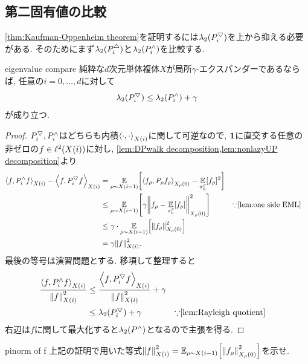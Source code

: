 \subsection{第二固有値の比較}
\cref{thm:Kaufman-Oppenheim theorem}を証明するには$\lambda_2(P^{\bigtriangledown}_i)$を上から抑える必要がある.
そのためにまず$\lambda_2(P^{\triangle}_i)$と$\lambda_2(P^{\land}_i)$を比較する.
\begin{lemma}{}{eigenvalue compare}
    純粋な$d$次元単体複体$X$が局所$\gamma$-エクスパンダーであるならば, 任意の$i=0,\dots,d$に対して
    \[ \lambda_2(P^{\bigtriangledown}_i) \le \lambda_2(P^{\land}_i) + \gamma \]
    が成り立つ.
\end{lemma}
\begin{proof}
    $P^{\bigtriangledown}_i,P^{\land}_i$はどちらも内積$\left\langle\cdot,\cdot\right\rangle_{X(i)}$に関して可逆なので,
    $\mathbf{1}$に直交する任意の非ゼロの$f \in \ispace$に対し,
    \cref{lem:DPwalk decomposition,lem:nonlazyUP decomposition}より
    \begin{align*}
        \iprod{f,\nonlazyPUD_i f} - \iprod{f,\PDU_i f} &= \E_{\rho\sim X(i-1)}\sbra*{ \iprod[X_\rho(0)]{f_\rho, P_\rho f_\rho} - \E_{\pi^\rho_0}[f_\rho]^2}  \\
        & \le \E_{\rho \sim X(i-1)}\sbra*{\gamma \inorm[X_\rho(0)]{f_\rho - \E_{\pi^\rho_0}[f_\rho]}^2 } & & \text{$\because$\cref{lem:one side EML}} \\
        &\le \gamma \cdot \E_{\rho\sim X(i-1)}\sbra*{\inorm[X_\rho(0)]{f_\rho}^2} \\
        &= \gamma \inorm{f}^2.
    \end{align*}
    最後の等号は演習問題とする.
    移項して整理すると
    \begin{align*}
        \frac{\iprod{f,\nonlazyPUD_i f}}{\inorm{f}^2} &\le \frac{\iprod{f,\PDU_if}}{\inorm{f}^2} + \gamma \\
        & \le \lambda_2(\PDU_i) + \gamma & & \text{$\because$\cref{lem:Rayleigh quotient}}
    \end{align*}
    右辺は$f$に関して最大化すると$\lambda_2(P^{\land})$となるので主張を得る.
\end{proof}

\begin{exercise}{}{pinorm of f}
    上記の証明で用いた等式$\inorm{f}^2  = \E_{\rho \sim X(i-1)}\sbra*{\inorm[X_\rho(0)]{f_\rho}^2}$を示せ.
\end{exercise}

